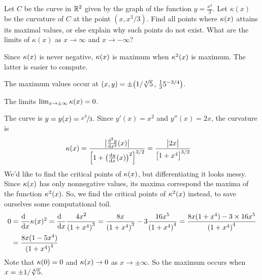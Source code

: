 \begin{question}[M317 2011D]  %
Let $C$ be the curve in $\mathbb{R}^2$ given by the graph of the function
$y=\frac{x^3}{3}$. Let $\kappa(x)$ be the curvature of $C$ at the point 
$(x, x^3/3)$. Find all points where $\kappa(x)$ attains its maximal values,
or else explain why such points do not exist. What are the limits of 
$\kappa(x)$ as $x \rightarrow \infty$ and
$x \rightarrow -\infty$?
\end{question}

\begin{hint} 
Since $\kappa(x)$ is never negative, $\kappa(x)$ is maximum when $\kappa^2(x)$ is maximum. The latter is easier to compute.
\end{hint}

\begin{answer} 
The maximum values occur at $(x,y)=\pm \big(1/\root{4}\of{5}\,,\,
                 \frac{1}{3}5^{-3/4}\big)$.

The limits $\lim_{x\rightarrow\pm\infty}\kappa(x) = 0$.
\end{answer}

\begin{solution} 
The curve is $y=y(x)=\nicefrac{x^3}{3}$. Since $y'(x) = x^2$ and
$y''(x) = 2x$, the curvature is
\begin{align*}
\ka(x)
&=\frac{\big|\difftwo{y}{x}(x)\big|}
  {\Big[1+\big(\diff{y}{x}(x)\big)^2\Big]^{3/2}}
=\frac{\big|2x\big|}
  {\big[1+x^4\big]^{3/2}}
\end{align*}
 We'd like to find the critical points of $\kappa(x)$, but differentiating it looks messy. Since $\kappa(x)$ has only nonnegative values, its maxima correspond the maxima of the function $\kappa^2(x)$. So, we find the critical points of $\kappa^2(x)$ instead, to save ourselves some computational toil.
\begin{align*}
0&=\diff{\hfill}{x}\ka(x)^2
=\diff{\hfill}{x}\frac{4x^2}{{(1+x^4)}^3}
=\frac{8x}{{(1+x^4)}^3} - 3\frac{16x^5}{{(1+x^4)}^4}
=\frac{8x(1+x^4)-3\times 16x^5}{{(1+x^4)}^4} \\
&=\frac{8x(1-5x^4)}{{(1+x^4)}^4}
\end{align*}
Note that $\kappa(0)=0$ and $\kappa(x)\rightarrow 0$ as $x\rightarrow\pm \infty$.
So the maximum occurs when $x=\pm 1/\root{4}\of{5}$.
\end{solution}


